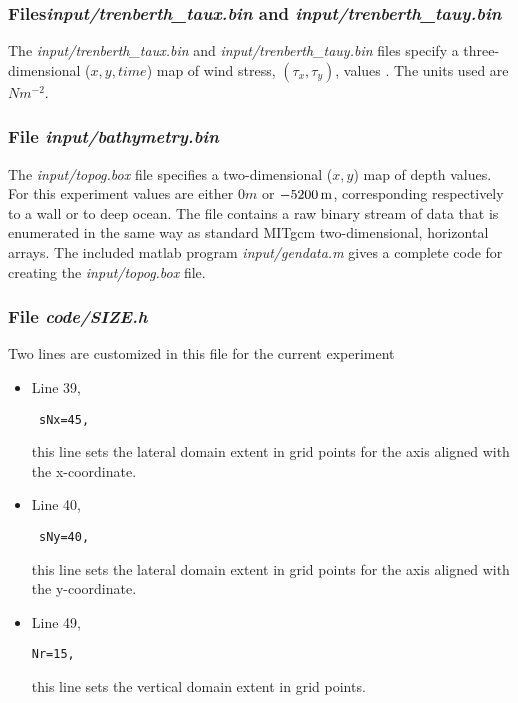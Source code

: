 \subsubsection{Files{\it input/trenberth\_taux.bin} and {\it
  input/trenberth\_tauy.bin}}

The {\it input/trenberth\_taux.bin} and {\it
  input/trenberth\_tauy.bin} files specify a three-dimensional
($x,y,time$) map of wind stress, $(\tau_{x},\tau_{y})$, values
\citep{trenberth90}. The units used are $Nm^{-2}$.

\subsubsection{File {\it input/bathymetry.bin}}


The {\it input/topog.box} file specifies a two-dimensional ($x,y$) 
map of depth values. For this experiment values are either
$0m$ or $-5200\,{\rm m}$, corresponding respectively to a wall or to deep
ocean. The file contains a raw binary stream of data that is enumerated
in the same way as standard MITgcm two-dimensional, horizontal arrays.
The included matlab program {\it input/gendata.m} gives a complete
code for creating the {\it input/topog.box} file.

\subsubsection{File {\it code/SIZE.h}}

Two lines are customized in this file for the current experiment

\begin{itemize}

\item Line 39, 
\begin{verbatim} sNx=45, \end{verbatim} this line sets
the lateral domain extent in grid points for the
axis aligned with the x-coordinate.

\item Line 40, 
\begin{verbatim} sNy=40, \end{verbatim} this line sets
the lateral domain extent in grid points for the
axis aligned with the y-coordinate.

\item Line 49, 
\begin{verbatim} 
Nr=15,
\end{verbatim} this line sets
the vertical domain extent in grid points.

\end{itemize}

